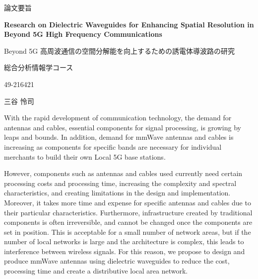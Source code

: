 \documentclass[a4paper,12pt]{report}
\begin{document}
\thispagestyle{plain}
\begin{center}
    \Large
    \begin{CJK}{UTF8}{ipxm}論文要旨\end{CJK}

    \vspace{2.0cm}

    \Large
    \textbf{Research on Dielectric Waveguides for Enhancing Spatial Resolution in Beyond 5G High Frequency Communications}

    \vspace{0.4cm}
    \begin{CJK}{UTF8}{ipxm}Beyond 5G 高周波通信の空間分解能を向上するための誘電体導波路の研究\end{CJK}
        
    \vspace{0.4cm}
    \large

    \vspace{0.4cm}
    \begin{CJK}{UTF8}{ipxm}総合分析情報学コース\end{CJK}

    \vspace{0.4cm}
    \begin{CJK}{UTF8}{ipxm}49-216421\end{CJK}

    \vspace{0.4cm}
    \begin{CJK}{UTF8}{ipxm}三谷 怜司\end{CJK}
       
    \vspace{0.9cm}
\end{center}

With the rapid development of communication technology, the demand
for antennas and cables, essential components for signal processing,
is growing by leaps and
bounds.
In addition,
demand for mmWave antennas and cables is increasing as
components for specific bands are necessary for individual
merchants to build their own Local 5G base stations.

However, components such as antennas and cables used
currently need certain
processing costs and processing time,
increasing the complexity and spectral characteristics,
and creating limitations in the design and implementation.
Moreover, it takes
more time and expense for specific antennas and cables
due to their particular
characteristics.
Furthermore, infrastructure created by traditional components
is often irreversible, and cannot be changed once
the components are set in position.
This is acceptable for a small number of network areas, but if the number
of local networks is large and the architecture is complex,
this leads to interference between wireless signals.
For this reason, we propose to design and produce
mmWave antennas using dielectric waveguides to reduce the cost,
processing time
and create a distributive local area network.
\end{document}
